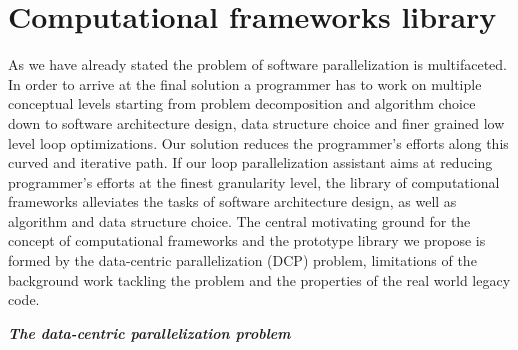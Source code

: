 \section{Computational frameworks library}
\label{introduction_frameworks}
\quad As we have already stated the problem of software parallelization is multifaceted. In order to arrive at the final solution a programmer has to work on multiple conceptual levels starting from problem decomposition and algorithm choice down to software architecture design, data structure choice and finer grained low level loop optimizations. Our solution reduces the programmer's efforts along this curved and iterative path. If our loop parallelization assistant aims at reducing programmer's efforts at the finest granularity level, the library of computational frameworks alleviates the tasks of software architecture design, as well as algorithm and data structure choice. The central motivating ground for the concept of computational frameworks and the prototype library we propose is formed by the data-centric parallelization (DCP) problem, limitations of the background work tackling the problem and the properties of the real world legacy code.
\begin{center}
\textbf{\large \textit{The data-centric parallelization problem}}
\end{center}
